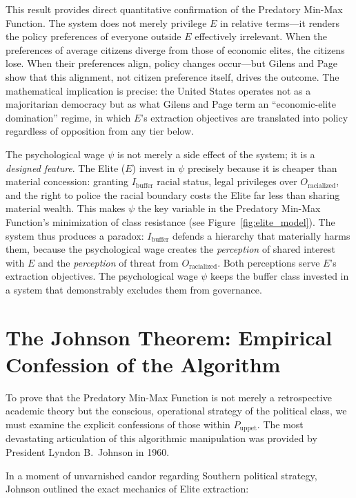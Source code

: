 \documentclass[12pt,openany]{book}
\begin{document}
This result provides direct quantitative confirmation of the Predatory Min-Max Function. The system does not merely privilege $E$ in relative terms---it renders the policy preferences of everyone outside $E$ effectively irrelevant. When the preferences of average citizens diverge from those of economic elites, the citizens lose. When their preferences align, policy changes occur---but Gilens and Page show that this alignment, not citizen preference itself, drives the outcome. The mathematical implication is precise: the United States operates not as a majoritarian democracy but as what Gilens and Page term an ``economic-elite domination'' regime, in which $E$'s extraction objectives are translated into policy regardless of opposition from any tier below.

The psychological wage $\psi$ is not merely a side effect of the system; it is a \textit{designed feature}. The Elite ($E$) invest in $\psi$ precisely because it is cheaper than material concession: granting $I_{\text{buffer}}$ racial status, legal privileges over $O_{\text{racialized}}$, and the right to police the racial boundary costs the Elite far less than sharing material wealth. This makes $\psi$ the key variable in the Predatory Min-Max Function's minimization of class resistance (see Figure~\ref{fig:elite_model}). The system thus produces a paradox: $I_{\text{buffer}}$ defends a hierarchy that materially harms them, because the psychological wage creates the \textit{perception} of shared interest with $E$ and the \textit{perception} of threat from $O_{\text{racialized}}$. Both perceptions serve $E$'s extraction objectives. The psychological wage $\psi$ keeps the buffer class invested in a system that demonstrably excludes them from governance.

\section{The Johnson Theorem: Empirical Confession of the Algorithm}

To prove that the Predatory Min-Max Function is not merely a retrospective academic theory but the conscious, operational strategy of the political class, we must examine the explicit confessions of those within $P_{\text{uppet}}$. The most devastating articulation of this algorithmic manipulation was provided by President Lyndon B.\ Johnson in 1960.

In a moment of unvarnished candor regarding Southern political strategy, Johnson outlined the exact mechanics of Elite extraction:
\end{document}
